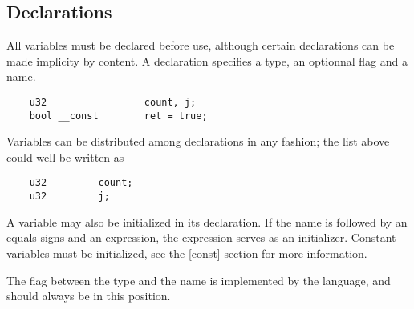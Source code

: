 \subsection{Declarations}

All variables must be declared before use, although certain
declarations can be made implicity by content. A declaration
specifies a type, an optionnal flag and a name.

\begin{lstlisting}
    u32                 count, j;
    bool __const        ret = true;
\end{lstlisting}

Variables can be distributed among declarations in any fashion; the
list above could well be written as

\begin{lstlisting}
    u32         count;
    u32         j;
\end{lstlisting}

A variable may also be initialized in its declaration. If the name
is followed by an equals signs and an expression, the expression
serves as an initializer. Constant variables must be initialized,
see the \ref{const} section for more information.

The flag between the type and the name is implemented by the language,
and should always be in this position.
